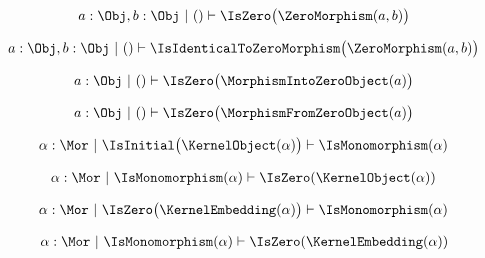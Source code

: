 \begin{sequent}
\begin{align*}
   a: \Obj, b: \Obj ~|~ () \vdash \IsZero \big( \ZeroMorphism( a, b ) \big)
\end{align*}
\end{sequent}

\begin{sequent}
\begin{align*}
   a: \Obj, b: \Obj ~|~ () \vdash \IsIdenticalToZeroMorphism \big( \ZeroMorphism( a, b ) \big)
\end{align*}
\end{sequent}

\begin{sequent}
\begin{align*}
   a: \Obj ~|~ () \vdash \IsZero \big( \MorphismIntoZeroObject( a ) \big)
\end{align*}
\end{sequent}

\begin{sequent}
\begin{align*}
   a: \Obj ~|~ () \vdash \IsZero \big( \MorphismFromZeroObject( a ) \big)
\end{align*}

\end{sequent}


\begin{sequent}
\begin{align*}
  \alpha: \Mor ~|~ \IsInitial\big( \KernelObject( \alpha ) \big) \vdash \IsMonomorphism( \alpha )
\end{align*}
\end{sequent}

\begin{sequent}
\begin{align*}
  \alpha: \Mor ~|~ \IsMonomorphism( \alpha ) \vdash \IsZero( \KernelObject( \alpha ) )
\end{align*}
\end{sequent}

\begin{sequent}
\begin{align*}
  \alpha: \Mor ~|~ \IsZero\big( \KernelEmbedding( \alpha ) \big) \vdash \IsMonomorphism( \alpha )
\end{align*}
\end{sequent}

\begin{sequent}
\begin{align*}
  \alpha: \Mor ~|~ \IsMonomorphism( \alpha ) \vdash \IsZero( \KernelEmbedding( \alpha ) )
\end{align*}
\end{sequent}

